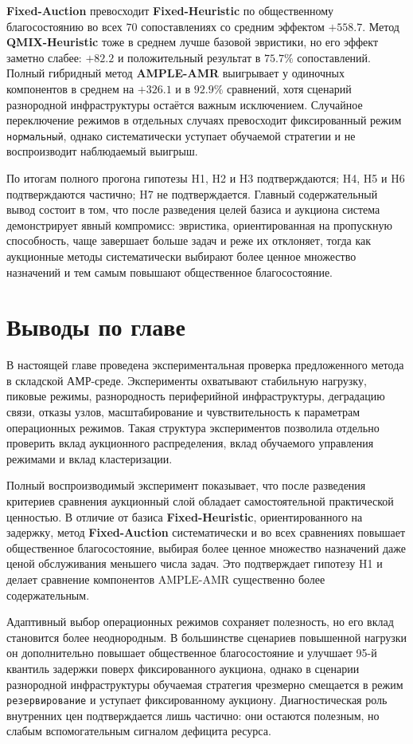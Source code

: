 \textbf{Fixed-Auction} превосходит \textbf{Fixed-Heuristic} по общественному благосостоянию во всех $70$ сопоставлениях со средним эффектом $+558.7$. Метод \textbf{QMIX-Heuristic} тоже в среднем лучше базовой эвристики, но его эффект заметно слабее: $+82.2$ и положительный результат в $75.7\%$ сопоставлений. Полный гибридный метод \textbf{AMPLE-AMR} выигрывает у одиночных компонентов в среднем на $+326.1$ и в $92.9\%$ сравнений, хотя сценарий разнородной инфраструктуры остаётся важным исключением. Случайное переключение режимов в отдельных случаях превосходит фиксированный режим \texttt{нормальный}, однако систематически уступает обучаемой стратегии и не воспроизводит наблюдаемый выигрыш.

По итогам полного прогона гипотезы H1, H2 и H3 подтверждаются; H4, H5 и H6 подтверждаются частично; H7 не подтверждается. Главный содержательный вывод состоит в том, что после разведения целей базиса и аукциона система демонстрирует явный компромисс: эвристика, ориентированная на пропускную способность, чаще завершает больше задач и реже их отклоняет, тогда как аукционные методы систематически выбирают более ценное множество назначений и тем самым повышают общественное благосостояние.

\section{Выводы по главе}

В настоящей главе проведена экспериментальная проверка предложенного метода в складской АМР-среде. Эксперименты охватывают стабильную нагрузку, пиковые режимы, разнородность периферийной инфраструктуры, деградацию связи, отказы узлов, масштабирование и чувствительность к параметрам операционных режимов. Такая структура экспериментов позволила отдельно проверить вклад аукционного распределения, вклад обучаемого управления режимами и вклад кластеризации.

Полный воспроизводимый эксперимент показывает, что после разведения критериев сравнения аукционный слой обладает самостоятельной практической ценностью. В отличие от базиса \textbf{Fixed-Heuristic}, ориентированного на задержку, метод \textbf{Fixed-Auction} систематически и во всех сравнениях повышает общественное благосостояние, выбирая более ценное множество назначений даже ценой обслуживания меньшего числа задач. Это подтверждает гипотезу H1 и делает сравнение компонентов AMPLE-AMR существенно более содержательным.

Адаптивный выбор операционных режимов сохраняет полезность, но его вклад становится более неоднородным. В большинстве сценариев повышенной нагрузки он дополнительно повышает общественное благосостояние и улучшает 95-й квантиль задержки поверх фиксированного аукциона, однако в сценарии разнородной инфраструктуры обучаемая стратегия чрезмерно смещается в режим \texttt{резервирование} и уступает фиксированному аукциону. Диагностическая роль внутренних цен подтверждается лишь частично: они остаются полезным, но слабым вспомогательным сигналом дефицита ресурса.

